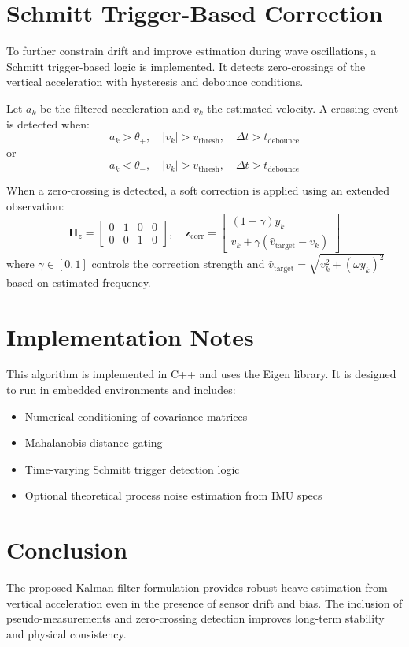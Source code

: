 \documentclass[11pt,letterpaper]{article}
\begin{document}
\section{Schmitt Trigger-Based Correction}
To further constrain drift and improve estimation during wave oscillations, a Schmitt trigger-based logic is implemented. It detects zero-crossings of the vertical acceleration with hysteresis and debounce conditions.

Let \( a_k \) be the filtered acceleration and \( v_k \) the estimated velocity. A crossing event is detected when:
\[
a_k > \theta_{+}, \quad |v_k| > v_\text{thresh}, \quad \Delta t > t_\text{debounce}
\]
or
\[
a_k < \theta_{-}, \quad |v_k| > v_\text{thresh}, \quad \Delta t > t_\text{debounce}
\]

When a zero-crossing is detected, a soft correction is applied using an extended observation:
\[
\mathbf{H}_z =
\begin{bmatrix}
0 & 1 & 0 & 0 \\
0 & 0 & 1 & 0
\end{bmatrix}, \quad
\mathbf{z}_\text{corr} =
\begin{bmatrix}
(1 - \gamma)y_k \\
v_k + \gamma(\hat{v}_\text{target} - v_k)
\end{bmatrix}
\]
where \( \gamma \in [0,1] \) controls the correction strength and \( \hat{v}_\text{target} = \sqrt{v_k^2 + (\omega y_k)^2} \) based on estimated frequency.

\section{Implementation Notes}

This algorithm is implemented in C++ and uses the Eigen library. It is designed to run in embedded environments and includes:
\begin{itemize}
  \item Numerical conditioning of covariance matrices
  \item Mahalanobis distance gating
  \item Time-varying Schmitt trigger detection logic
  \item Optional theoretical process noise estimation from IMU specs
\end{itemize}

\section{Conclusion}
The proposed Kalman filter formulation provides robust heave estimation from vertical acceleration even in the presence of sensor drift and bias. The inclusion of pseudo-measurements and zero-crossing detection improves long-term stability and physical consistency.
\end{document}
